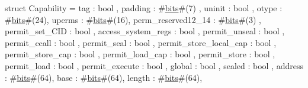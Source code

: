 struct Capability = {
  tag                     : bool    ,
  padding                 : #\hyperref[zbits]{bits}#(7) ,
  uninit		  : bool    ,
  otype                   : #\hyperref[zbits]{bits}#(24),
  uperms                  : #\hyperref[zbits]{bits}#(16),
  perm_reserved12_14      : #\hyperref[zbits]{bits}#(3) ,
  permit_set_CID          : bool    ,
  access_system_regs      : bool    ,
  permit_unseal           : bool    ,
  permit_ccall            : bool    ,
  permit_seal             : bool    ,
  permit_store_local_cap  : bool    ,
  permit_store_cap        : bool    ,
  permit_load_cap         : bool    ,
  permit_store            : bool    ,
  permit_load             : bool    ,
  permit_execute          : bool    ,
  global                  : bool    ,
  sealed                  : bool    ,
  address                 : #\hyperref[zbits]{bits}#(64),
  base                    : #\hyperref[zbits]{bits}#(64),
  length                  : #\hyperref[zbits]{bits}#(64),
}
